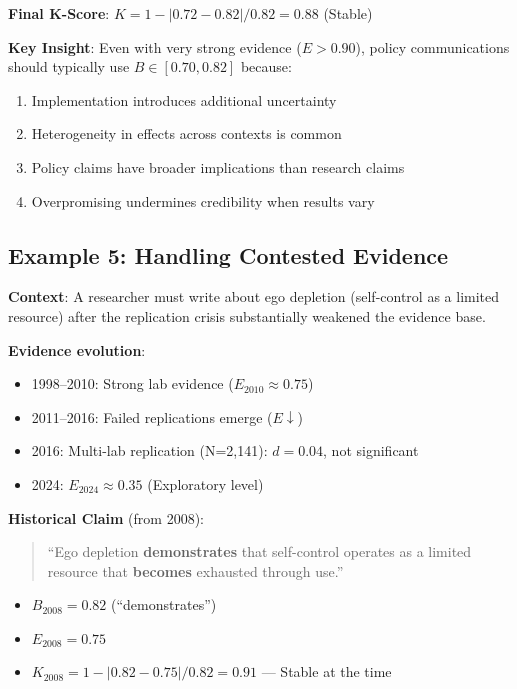 \documentclass[11pt,a4paper]{article}
\begin{document}
\textbf{Final K-Score}: $K = 1 - |0.72 - 0.82| / 0.82 = 0.88$ (Stable)

\textbf{Key Insight}: Even with very strong evidence ($E > 0.90$), policy communications should typically use $B \in [0.70, 0.82]$ because:
\begin{enumerate}
    \item Implementation introduces additional uncertainty
    \item Heterogeneity in effects across contexts is common
    \item Policy claims have broader implications than research claims
    \item Overpromising undermines credibility when results vary
\end{enumerate}

\subsection{Example 5: Handling Contested Evidence}

\begin{practicalbox}[title={Scenario: Communicating About Ego Depletion}]
\textbf{Context}: A researcher must write about ego depletion (self-control as a limited resource) after the replication crisis substantially weakened the evidence base.

\textbf{Evidence evolution}:
\begin{itemize}
    \item 1998--2010: Strong lab evidence ($E_{2010} \approx 0.75$)
    \item 2011--2016: Failed replications emerge ($E \downarrow$)
    \item 2016: Multi-lab replication (N=2,141): $d = 0.04$, not significant
    \item 2024: $E_{2024} \approx 0.35$ (Exploratory level)
\end{itemize}
\end{practicalbox}

\textbf{Historical Claim} (from 2008):
\begin{quote}
``Ego depletion \textbf{demonstrates} that self-control operates as a limited resource that \textbf{becomes} exhausted through use.''
\end{quote}
\begin{itemize}
    \item $B_{2008} = 0.82$ (``demonstrates'')
    \item $E_{2008} = 0.75$
    \item $K_{2008} = 1 - |0.82 - 0.75| / 0.82 = 0.91$ --- Stable at the time
\end{itemize}
\end{document}
